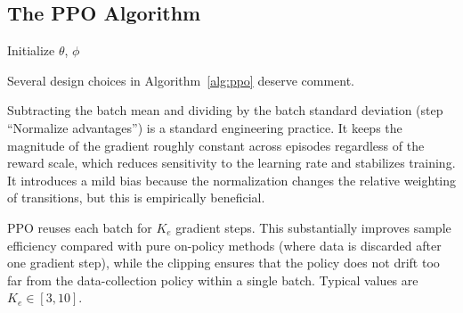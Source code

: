 \subsection{The PPO Algorithm}

\begin{algorithm}[ht]
\caption{Proximal Policy Optimization (PPO)}
\label{alg:ppo}
\DontPrintSemicolon
{}
Initialize $\theta$, $\phi$\;
\end{algorithm}

Several design choices in Algorithm~\ref{alg:ppo} deserve comment.

\begin{remark}
Subtracting the batch mean and dividing by the batch standard deviation
(step ``Normalize advantages'') is a standard engineering practice.
It keeps the magnitude of the gradient roughly constant across episodes
regardless of the reward scale, which reduces sensitivity to the learning
rate and stabilizes training.  It introduces a mild bias because the
normalization changes the relative weighting of transitions, but this is
empirically beneficial.
\end{remark}

\begin{remark}
PPO reuses each batch for $K_e$ gradient steps.  This substantially
improves sample efficiency compared with pure on-policy methods (where
data is discarded after one gradient step), while the clipping ensures
that the policy does not drift too far from the data-collection policy
within a single batch.  Typical values are $K_e \in [3, 10]$.
\end{remark}

